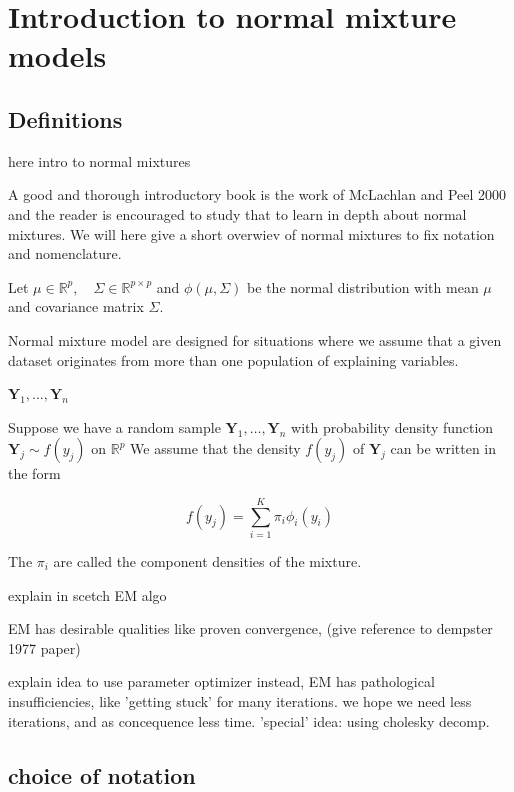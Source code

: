 \chapter{Introduction to normal mixture models}%

\section{Definitions}

here intro to normal mixtures

A good and thorough introductory book is the work of McLachlan and Peel 2000 and
the reader is encouraged to study that to learn in depth about normal mixtures. 
We will here give a short overwiev of normal mixtures to fix notation and nomenclature.

Let $ \mu \in \mathbb{R}^p , \quad \Sigma \in \mathbb{R}^{p \times p} $ and 
$ \phi(\mu, \Sigma) $ be the normal distribution with
mean $ \mu $ and covariance matrix $ \Sigma $.

Normal mixture model are designed for situations where we assume that a given 
dataset originates from more than one population of explaining variables.

$ \pmb{Y}_1, \dots , \pmb{Y}_n $

\begin{definition}
    Suppose we have a random sample $ \pmb{Y}_1, \dots , \pmb{Y}_n $ with 
    probability density function $ \pmb{Y}_j \sim f(y_j) $ on $\mathbb{R}^p$
    We assume that the density $ f(y_j) $ of $ \pmb{Y}_j $ can be written in
    the form 

    \[ f(y_j) = \sum_{i=1}^{K} \pi_i \phi_i (y_i) \]

    The $ \pi_i $ are called the component densities of the mixture.
\end{definition}

explain in scetch EM algo

EM has desirable qualities like proven convergence, (give reference to dempster 1977 paper)

explain idea to use parameter optimizer instead,
EM has pathological insufficiencies, like 'getting stuck' for many iterations.
we hope we need less iterations, and as concequence less time.
'special' idea: using cholesky decomp.


\section{choice of notation}


